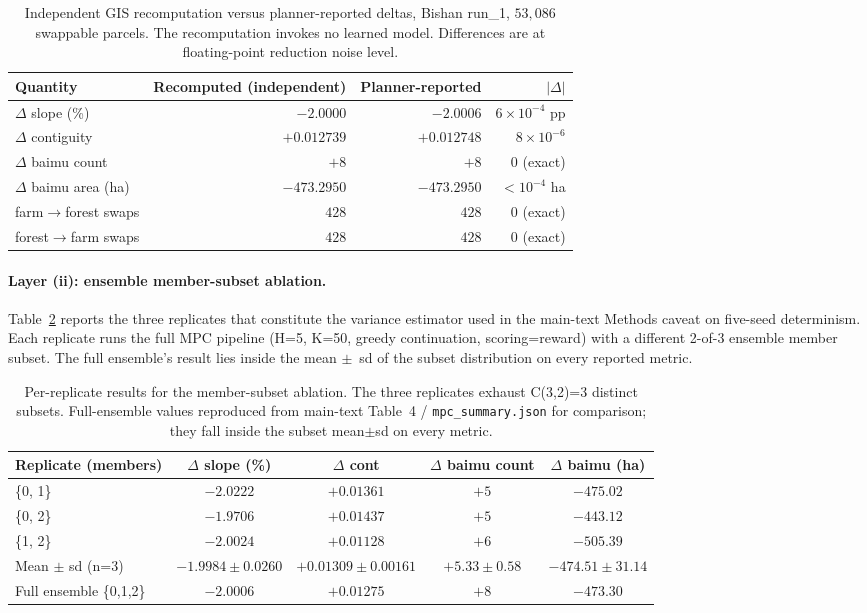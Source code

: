 \documentclass[11pt]{article}
\begin{document}
\begin{table}[htbp]
\centering
\small
\caption{Independent GIS recomputation versus planner-reported deltas, Bishan run\_1, $53{,}086$ swappable parcels. The recomputation invokes no learned model. Differences are at floating-point reduction noise level.}
\label{tab:si-validate}
\begin{tabular}{lrrr}
\toprule
Quantity & Recomputed (independent) & Planner-reported & $|\Delta|$ \\
\midrule
$\Delta$ slope (\%) & $-2.0000$ & $-2.0006$ & $6 \times 10^{-4}$ pp \\
$\Delta$ contiguity & $+0.012739$ & $+0.012748$ & $8 \times 10^{-6}$ \\
$\Delta$ baimu count & $+8$ & $+8$ & $0$ (exact) \\
$\Delta$ baimu area (ha) & $-473.2950$ & $-473.2950$ & $< 10^{-4}$ ha \\
farm$\rightarrow$forest swaps & $428$ & $428$ & $0$ (exact) \\
forest$\rightarrow$farm swaps & $428$ & $428$ & $0$ (exact) \\
\bottomrule
\end{tabular}
\end{table}

\paragraph{Layer (ii): ensemble member-subset ablation.} Table~\ref{tab:si-subset} reports the three replicates that constitute the variance estimator used in the main-text Methods caveat on five-seed determinism. Each replicate runs the full MPC pipeline (H=5, K=50, greedy continuation, scoring=reward) with a different 2-of-3 ensemble member subset. The full ensemble's result lies inside the mean $\pm$~sd of the subset distribution on every reported metric.

\begin{table}[htbp]
\centering
\small
\caption{Per-replicate results for the member-subset ablation. The three replicates exhaust C(3,2)=3 distinct subsets. Full-ensemble values reproduced from main-text Table~4 / \texttt{mpc\_summary.json} for comparison; they fall inside the subset mean$\pm$sd on every metric.}
\label{tab:si-subset}
\begin{tabular}{lcccc}
\toprule
Replicate (members) & $\Delta$ slope (\%) & $\Delta$ cont & $\Delta$ baimu count & $\Delta$ baimu (ha) \\
\midrule
\{0, 1\} & $-2.0222$ & $+0.01361$ & $+5$ & $-475.02$ \\
\{0, 2\} & $-1.9706$ & $+0.01437$ & $+5$ & $-443.12$ \\
\{1, 2\} & $-2.0024$ & $+0.01128$ & $+6$ & $-505.39$ \\
\midrule
Mean $\pm$ sd (n=3) & $-1.9984 \pm 0.0260$ & $+0.01309 \pm 0.00161$ & $+5.33 \pm 0.58$ & $-474.51 \pm 31.14$ \\
Full ensemble \{0,1,2\} & $-2.0006$ & $+0.01275$ & $+8$ & $-473.30$ \\
\bottomrule
\end{tabular}
\end{table}
\end{document}
